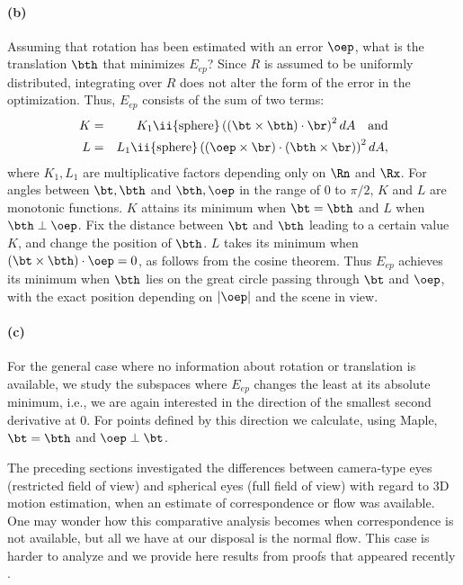\documentclass[10pt,twocolumn]{article}
\begin{document}
\paragraph{(b)}
Assuming that rotation has been estimated with an error $\oep$, what
is the translation $\bth$ that minimizes $E_{ep}$? Since $R$ is
assumed to be uniformly distributed, integrating over $R$ does not
alter the form of the error in the optimization. Thus, $E_{ep}$
consists of the sum of two terms:
\begin{eqnarray*}
  K & = & K_1\ii{\rm sphere}\left(\left(\bt \times \bth\right) \cdot
  \br\right)^2 dA \quad\mbox{and}\\
L & = & L_1\ii{\rm sphere}
  \left(\left(\oep \times \br\right) \cdot \left(\bth \times
    \br\right)\right)^2 dA,
\end{eqnarray*}
where $K_1, L_1$ are multiplicative factors depending only on $\Rn$
and $\Rx$. For angles between $\bt, \bth$ and $\bth, \oep$ in the
range of 0 to $\pi/2$, $K$ and $L$ are monotonic functions. $K$
attains its minimum when $\bt = \bth$ and $L$ when $\bth \perp \oep$.
Fix the distance between $\bt$ and $\bth$ leading to a
certain value $K$, and change the position of $\bth$. $L$ takes its
minimum when $(\bt \times \bth) \cdot \oep = 0$, as follows from the
cosine theorem.  Thus $E_{ep}$ achieves its minimum when $\bth$ lies
on the great circle passing through $\bt$ and $\oep$, with the exact
position depending on $|\oep |$ and the scene in view.

\paragraph{(c)}
For the general case where no information about rotation or
translation is available, we study the subspaces where $E_{ep}$
changes the least at its absolute minimum, i.e., we are again
interested in the direction of the smallest second derivative at 0.
For points defined by this direction we calculate, using Maple, $\bt =
\bth$ and $\oep \perp \bt$.

The preceding sections investigated the differences between
camera-type eyes (restricted field of view) and spherical eyes (full
field of view) with regard to 3D motion estimation, when an estimate
of correspondence or flow was available. One may wonder how this
comparative analysis becomes when correspondence is not available, but
all we have at our disposal is the normal flow. This case is harder to
analyze and we provide here results from proofs that appeared recently
\cite{proofijcv,tr:design}.
\end{document}
